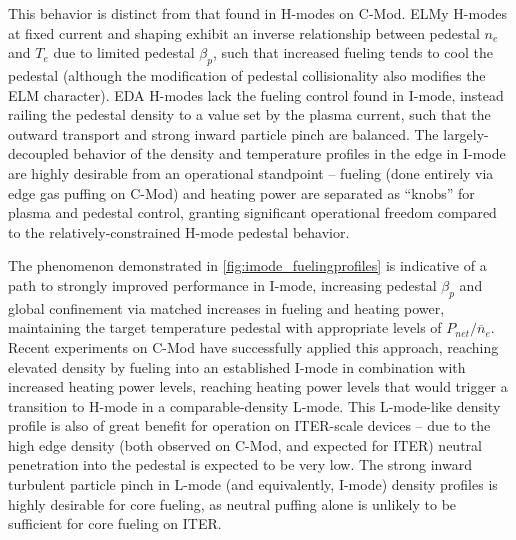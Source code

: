 This behavior is distinct from that found in H-modes on C-Mod.  ELMy H-modes at fixed current and shaping exhibit an inverse relationship between pedestal $n_e$ and $T_e$ due to limited pedestal $\beta_p$, such that increased fueling tends to cool the pedestal (although the modification of pedestal collisionality also modifies the ELM character).  EDA H-modes lack the fueling control found in I-mode, instead railing the pedestal density to a value set by the plasma current, such that the outward transport and strong inward particle pinch are balanced.  The largely-decoupled behavior of the density and temperature profiles in the edge in I-mode are highly desirable from an operational standpoint -- fueling (done entirely via edge gas puffing on C-Mod) and heating power are separated as ``knobs'' for plasma and pedestal control, granting significant operational freedom compared to the relatively-constrained H-mode pedestal behavior.

The phenomenon demonstrated in \cref{fig:imode_fuelingprofiles} is indicative of a path to strongly improved performance in I-mode, increasing pedestal $\beta_p$ and global confinement via matched increases in fueling and heating power, maintaining the target temperature pedestal with appropriate levels of $P_{net}/\overline{n}_e$.  Recent experiments on C-Mod \cite{Hubbard2012} have successfully applied this approach, reaching elevated density by fueling into an established I-mode in combination with increased heating power levels, reaching heating power levels that would trigger a transition to H-mode in a comparable-density L-mode.  This L-mode-like density profile is also of great benefit for operation on ITER-scale devices -- due to the high edge density (both observed on C-Mod, and expected for ITER) neutral penetration into the pedestal is expected to be very low.  The strong inward turbulent particle pinch \cite{Kesner2012} in L-mode (and equivalently, I-mode) density profiles is highly desirable for core fueling, as neutral puffing alone is unlikely to be sufficient for core fueling on ITER.

